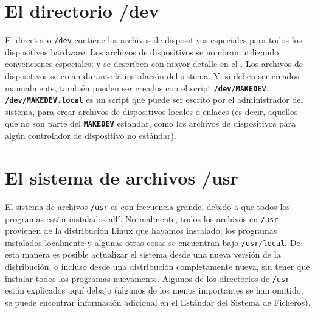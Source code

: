 \section{ El directorio /dev}

El directorio \texttt{/dev} contiene los archivos de
dispositivos especiales para todos los dispositivos hardware. Los archivos de
dispositivos se nombran utilizando convenciones especiales; y se describen
con mayor detalle 
en el 
. Los archivos de dispositivos se crean durante
la instalación del sistema. Y, si deben ser creados manualmente, también pueden ser creados con el script
\texttt{\textbf{/dev/MAKEDEV}}. \texttt{\textbf{/dev/MAKEDEV.local}} es un
script que puede ser escrito por el administrador del sistema, para crear archivos de
dispositivos locales o enlaces (es decir, aquellos que no son parte del
\texttt{\textbf{MAKEDEV}} estándar, como los archivos de dispositivos para algún
controlador de dispositivo no estándar).  




\section{ El sistema de archivos /usr}

El sistema de archivos \texttt{/usr} es con frecuencia grande,
debido a que todos los programas están instalados allí. Normalmente, todos los
archivos en \texttt{/usr} provienen de la distribución Linux que
hayamos instalado; los programas instalados localmente y algunas otras cosas
se encuentran bajo \texttt{/usr/local}. De esta manera es posible
actualizar el sistema desde una nueva versión de la distribución, o incluso
desde una distribución completamente nueva, sin tener que instalar todos los
programas nuevamente. Algunos de los directorios de \texttt{/usr}
están explicados aquí debajo (algunos de los menos importantes se han omitido,
se puede encontrar información adicional en el Estándar del Sistema de
Ficheros).  


